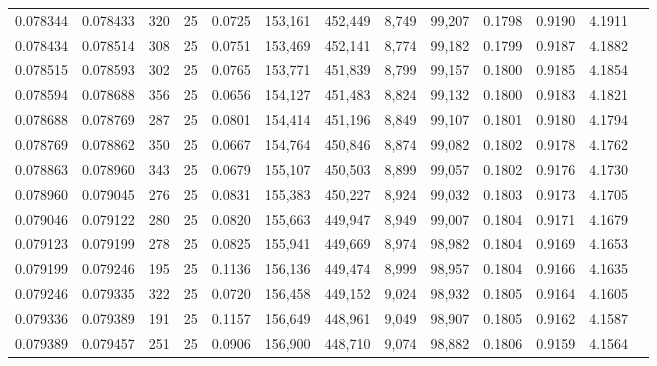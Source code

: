 \begin{tabular}{rrrrrrrrrrrrr}
0.078344 & 0.078433 &   320 &  25 &                                     0.0725 & 153,161 & 452,449 &   8,749 &  99,207 & 0.1798 & 0.9190 & 4.1911 \\
0.078434 & 0.078514 &   308 &  25 &                                     0.0751 & 153,469 & 452,141 &   8,774 &  99,182 & 0.1799 & 0.9187 & 4.1882 \\
0.078515 & 0.078593 &   302 &  25 &                                     0.0765 & 153,771 & 451,839 &   8,799 &  99,157 & 0.1800 & 0.9185 & 4.1854 \\
0.078594 & 0.078688 &   356 &  25 &                                     0.0656 & 154,127 & 451,483 &   8,824 &  99,132 & 0.1800 & 0.9183 & 4.1821 \\
0.078688 & 0.078769 &   287 &  25 &                                     0.0801 & 154,414 & 451,196 &   8,849 &  99,107 & 0.1801 & 0.9180 & 4.1794 \\
0.078769 & 0.078862 &   350 &  25 &                                     0.0667 & 154,764 & 450,846 &   8,874 &  99,082 & 0.1802 & 0.9178 & 4.1762 \\
0.078863 & 0.078960 &   343 &  25 &                                     0.0679 & 155,107 & 450,503 &   8,899 &  99,057 & 0.1802 & 0.9176 & 4.1730 \\
0.078960 & 0.079045 &   276 &  25 &                                     0.0831 & 155,383 & 450,227 &   8,924 &  99,032 & 0.1803 & 0.9173 & 4.1705 \\
0.079046 & 0.079122 &   280 &  25 &                                     0.0820 & 155,663 & 449,947 &   8,949 &  99,007 & 0.1804 & 0.9171 & 4.1679 \\
0.079123 & 0.079199 &   278 &  25 &                                     0.0825 & 155,941 & 449,669 &   8,974 &  98,982 & 0.1804 & 0.9169 & 4.1653 \\
0.079199 & 0.079246 &   195 &  25 &                                     0.1136 & 156,136 & 449,474 &   8,999 &  98,957 & 0.1804 & 0.9166 & 4.1635 \\
0.079246 & 0.079335 &   322 &  25 &                                     0.0720 & 156,458 & 449,152 &   9,024 &  98,932 & 0.1805 & 0.9164 & 4.1605 \\
0.079336 & 0.079389 &   191 &  25 &                                     0.1157 & 156,649 & 448,961 &   9,049 &  98,907 & 0.1805 & 0.9162 & 4.1587 \\
0.079389 & 0.079457 &   251 &  25 &                                     0.0906 & 156,900 & 448,710 &   9,074 &  98,882 & 0.1806 & 0.9159 & 4.1564 \\

\end{tabular}
